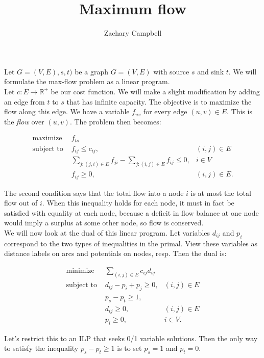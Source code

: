 \documentclass[11pt]{article}
\begin{document}
\title{Maximum flow}
\author{Zachary Campbell}

\maketitle

Let $G = (V,E),s,t)$ be a graph $G = (V,E)$ with source $s$ and sink $t$. We will formulate the 
max-flow problem as a linear program.\\
Let $c:E\to \mathbb{R}^{+}$ be our cost function. We will make a slight modification by 
adding an edge from $t$ to $s$ that has infinite capacity. The objective is to maximize the flow 
along this edge. We have a variable $f_{uv}$ for every edge 
$(u,v)\in E$. This is the \emph{flow} over $(u,v)$. The problem then becomes:

\begin{align*}
	\text{maximize } &f_{ts}\\
	\text{subject to } &f_{ij}\leq c_{ij},          &(i,j)\in E\\
	&\sum_{j:(j,i)\in E} f_{ji} - \sum_{j:(i,j)\in E} f_{ij} \leq 0,     &i\in V\\
	&f_{ij}\geq 0,           &(i,j)\in E.
\end{align*}

The second condition says that the total flow into a node $i$ is at most the total flow out of $i$. 
When this inequality holds for each node, it must in fact be satisfied with equality at each 
node, because a deficit in flow balance at one node would imply a surplus at some other node, so flow 
is conserved.\\
We will now look at the dual of this linear program. Let variables $d_{ij}$ and $p_i$ correspond to 
the two types of inequalities in the primal. View these variables as distance labels on arcs and 
potentials on nodes, resp. Then the dual is:

\begin{align*}
	\text{minimize } &\sum_{(i,j)\in E} c_{ij}d_{ij} \\
	\text{subject to } &d_{ij} - p_i + p_j \geq 0,     &(i,j)\in E \\
	&p_s - p_t \geq 1, \\
	&d_{ij}\geq 0,   &(i,j)\in E \\
	&p_i\geq 0,    &i\in V. 
\end{align*}

Let's restrict this to an ILP that seeks 0/1 variable solutions. 
Then the only way to satisfy the inequality $p_s - p_t\geq 1$ is to set $p_s = 1$ and $p_t = 0$.
\end{document}
